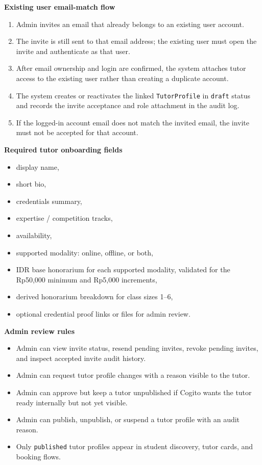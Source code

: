 \documentclass[11pt,a4paper]{article}
\begin{document}
\textbf{Existing user email-match flow}
\begin{enumerate}
    \item Admin invites an email that already belongs to an existing user account.
    \item The invite is still sent to that email address; the existing user must open the invite and authenticate as that user.
    \item After email ownership and login are confirmed, the system attaches tutor access to the existing user rather than creating a duplicate account.
    \item The system creates or reactivates the linked \texttt{TutorProfile} in \texttt{draft} status and records the invite acceptance and role attachment in the audit log.
    \item If the logged-in account email does not match the invited email, the invite must not be accepted for that account.
\end{enumerate}

\textbf{Required tutor onboarding fields}
\begin{itemize}
    \item display name,
    \item short bio,
    \item credentials summary,
    \item expertise / competition tracks,
    \item availability,
    \item supported modality: online, offline, or both,
    \item IDR base honorarium for each supported modality, validated for the Rp50,000 minimum and Rp5,000 increments,
    \item derived honorarium breakdown for class sizes 1--6,
    \item optional credential proof links or files for admin review.
\end{itemize}

\textbf{Admin review rules}
\begin{itemize}
    \item Admin can view invite status, resend pending invites, revoke pending invites, and inspect accepted invite audit history.
    \item Admin can request tutor profile changes with a reason visible to the tutor.
    \item Admin can approve but keep a tutor unpublished if Cogito wants the tutor ready internally but not yet visible.
    \item Admin can publish, unpublish, or suspend a tutor profile with an audit reason.
    \item Only \texttt{published} tutor profiles appear in student discovery, tutor cards, and booking flows.
\end{itemize}
\end{document}

